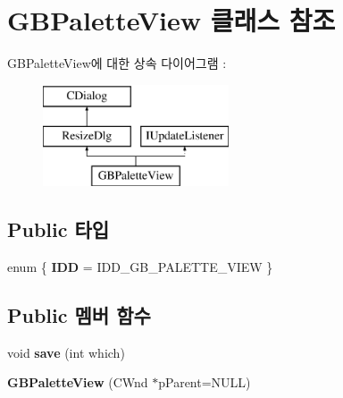\hypertarget{class_g_b_palette_view}{}\section{G\+B\+Palette\+View 클래스 참조}
\label{class_g_b_palette_view}
G\+B\+Palette\+View에 대한 상속 다이어그램 \+: \begin{figure}[H]
\begin{center}
\leavevmode
\includegraphics[height=3.000000cm]{class_g_b_palette_view}
\end{center}
\end{figure}
\subsection*{Public 타입}
\begin{DoxyCompactItemize}
\item 
\mbox{\label{class_g_b_palette_view_a523298d9315ba49a30c3982b035329fb}} 
enum \{ {\bfseries I\+DD} = I\+D\+D\+\_\+\+G\+B\+\_\+\+P\+A\+L\+E\+T\+T\+E\+\_\+\+V\+I\+EW
 \}
\end{DoxyCompactItemize}
\subsection*{Public 멤버 함수}
\begin{DoxyCompactItemize}
\item 
\mbox{\label{class_g_b_palette_view_a90cca0ba09442c669f7403d31e8ab0ee}} 
void {\bfseries save} (int which)
\item 
\mbox{\label{class_g_b_palette_view_a2e6568baf28747b9f2f0169cbbaf6e20}} 
{\bfseries G\+B\+Palette\+View} (C\+Wnd $\ast$p\+Parent=N\+U\+LL)
\end{DoxyCompactItemize}
